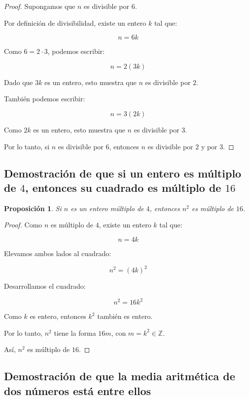 \documentclass[12pt,final]{report}
\theoremstyle{plain}
\newtheorem{proposition}[theorem]{Proposición}
\theoremstyle{definition}
\begin{document}
\begin{proof}

Supongamos que $n$ es divisible por $6$.

Por definición de divisibilidad, existe un entero $k$ tal que:

\[
n=6k
\]

Como $6=2\cdot 3$, podemos escribir:

\[
n=2(3k)
\]

Dado que $3k$ es un entero, esto muestra que $n$ es divisible por $2$.

También podemos escribir:

\[
n=3(2k)
\]

Como $2k$ es un entero, esto muestra que $n$ es divisible por $3$.

Por lo tanto, si $n$ es divisible por $6$, entonces $n$ es divisible por $2$ y por $3$.

\end{proof}

\newpage

\subsection{Demostración de que si un entero es múltiplo de $4$, entonces su cuadrado es múltiplo de $16$}

\begin{proposition}
Si $n$ es un entero múltiplo de $4$, entonces $n^2$ es múltiplo de $16$.
\end{proposition}

\begin{proof}

Como $n$ es múltiplo de $4$, existe un entero $k$ tal que:

\[
n=4k
\]

Elevamos ambos lados al cuadrado:

\[
n^2=(4k)^2
\]

Desarrollamos el cuadrado:

\[
n^2=16k^2
\]

Como $k$ es entero, entonces $k^2$ también es entero.

Por lo tanto, $n^2$ tiene la forma $16m$, con $m=k^2\in\mathbb{Z}$.

Así, $n^2$ es múltiplo de $16$.

\end{proof}

\subsection{Demostración de que la media aritmética de dos números está entre ellos}
\end{document}

